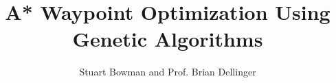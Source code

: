 \documentclass[twocolumn]{article}
\begin{document}
\title {A* Waypoint Optimization Using Genetic Algorithms}
\author{Stuart Bowman and Prof. Brian Dellinger}
\maketitle








\end{document}
